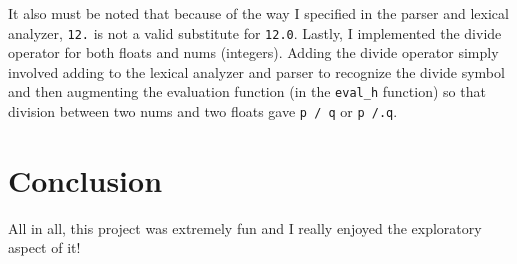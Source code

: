 \documentclass{article}
\def\code#1{\texttt{#1}}
\begin{document}
It also must be noted that because of the way I specified in the parser and lexical analyzer, \code{12.} is not a valid substitute for \code{12.0}. Lastly, I implemented the divide operator for both floats and nums (integers). Adding the divide operator simply involved adding to the lexical analyzer and parser to recognize the divide symbol and then augmenting the evaluation function (in the \code{eval\_h} function) so that division between two nums and two floats gave \code{p / q} or \code{p /.q}. 

\section{Conclusion}

All in all, this project was extremely fun and I really enjoyed the exploratory aspect of it!
\end{document}
